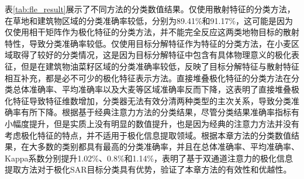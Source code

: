 表\ref{tab:fle_result}展示了不同方法的分类数值结果。仅使用散射特征的分类方法，在草地和建筑物区域的分类准确率较低，分别为89.41\%和91.17\%，这可能是因为仅使用相干矩阵作为极化特征的分类方法，并不能完全反应这两类地物目标的散射特性，导致分类准确率较低。仅使用目标分解特征作为特征的分类方法，在小麦区域取得了较好的分类情况，这是因为目标分解特征中包含有具体物理意义的极化表征，但是在建筑物油菜籽区域的分类准确率较低，反映了目标分解特征与散射特征相互补充，都是必不可少的极化特征表示方法。直接堆叠极化特征的分类方法在分类总体准确率、平均准确率以及大麦等区域准确率反而下降，这表明了直接堆叠极化特征导致特征维数增加，分类器无法有效分清两种类型的主次关系，导致分类准确率有所下降。根据基于经典注意力方法的分类结果，尽管分类结果准确率指标有小幅度提升，但是实质上没有明显的数值提升，也是因为经典的注意力方法并没有考虑极化特征的特点，并不适用于极化信息提取领域。根据本章方法的分类数值结果，在大多数的类别都具有最高的分类准确率，并且在总体准确率、平均准确率、Kappa系数分别提升1.02\%、0.8\%和1.14\%，表明了基于双通道注意力的极化信息提取方法对于极化SAR目标分类具有优势，验证了本章方法的有效性和优越性。

